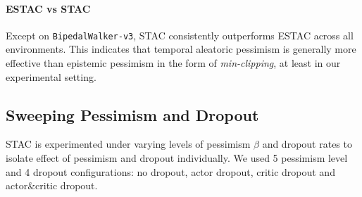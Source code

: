 \documentclass[10pt]{article} %
\begin{document}
\paragraph{ESTAC vs STAC} Except on \verb|BipedalWalker-v3|, STAC consistently outperforms ESTAC across all environments. This indicates that temporal aleatoric pessimism is generally more effective than epistemic pessimism in the form of \textit{min-clipping}, at least in our experimental setting. 


\subsection{Sweeping Pessimism and Dropout}

STAC is experimented under varying levels of pessimism $\beta$ and dropout rates to isolate effect of pessimism and dropout individually. We used 5 pessimism level and 4 dropout configurations: no dropout, actor dropout, critic dropout and actor\&critic dropout. 
\end{document}

